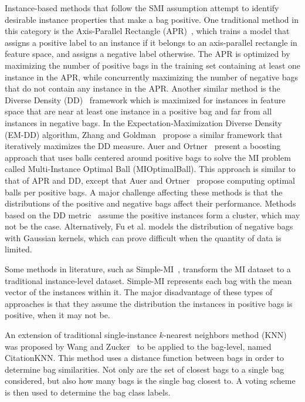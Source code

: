 \documentclass[reqno]{vcuthesis}
\numberwithin{equation}{chapter}
\begin{document}
Instance-based methods that follow the SMI assumption attempt to identify desirable instance properties that make a bag positive. One traditional method in this category is the Axis-Parallel Rectangle (APR)~\cite{Dietterich1997}, which trains a model that assigns a positive label to an instance if it belongs to an axis-parallel rectangle in feature space, and assigns a negative label otherwise. The APR is optimized by maximizing the number of positive bags in the training set containing at least one instance in the APR, while concurrently maximizing the number of negative bags that do not contain any instance in the APR. Another similar method is the Diverse Density (DD)~\cite{Maron1998} framework which is maximized for instances in feature space that are near at least one instance in a positive bag and far from all instances in negative bags. In the Expectation-Maximization Diverse Density (EM-DD) algorithm, Zhang and Goldman~\cite{Zhang2001} propose a similar framework that iteratively maximizes the DD measure. Auer and Ortner~\cite{Auer2004} present a boosting approach that uses balls centered around positive bags to solve the MI problem called Multi-Instance Optimal Ball (MIOptimalBall). This approach is similar to that of APR and DD, except that Auer and Ortner~\cite{Auer2004} propose computing optimal balls per positive bags. A major challenge affecting these methods is that the distributions of the positive and negative bags affect their performance. Methods based on the DD metric~\cite{Carbonneau2016,Chen2006,Chen2004} assume the positive instances form a cluster, which may not be the case. Alternatively, Fu et al.\cite{Fu2011} models the distribution of negative bags with Gaussian kernels, which can prove difficult when the quantity of data is limited.

Some methods in literature, such as Simple-MI~\cite{Dong2006}, transform the MI dataset to a traditional instance-level dataset. Simple-MI represents each bag with the mean vector of the instances within it. The major disadvantage of these types of approaches is that they assume the distribution the instances in positive bags is positive, when it may not be.

An extension of traditional single-instance $k$-nearest neighbors method (KNN) was proposed by Wang and Zucker~\cite{Wang2000} to be applied to the bag-level, named CitationKNN. This method uses a distance function between bags in order to determine bag similarities. Not only are the set of closest bags to a single bag  considered, but also how many bags is the single bag closest to. A voting scheme is then used to determine the bag class labels.
\end{document}
